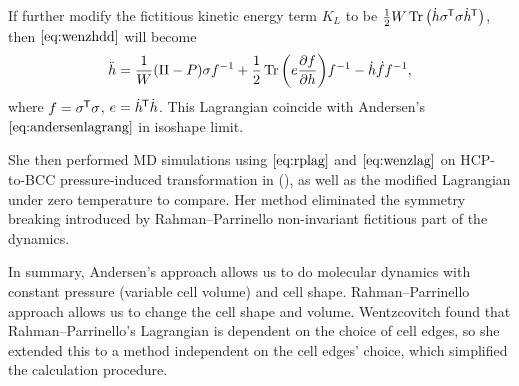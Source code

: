 If further modify the fictitious kinetic energy term $K_L$ to be
$ \frac{ 1 }{ 2 } W \Tr \big( \dot{ h } \sigma^{\mkern-1.5mu\mathsf{T}} \sigma \dot{ h }^{\mkern-1.5mu\mathsf{T}} \big)$,
then $\eqref{eq:wenzhdd}$ will become
\begin{equation}\label{eq:wenzhdd2}
	\ddot{h} = \frac{ 1 }{ W } (\Pi - P) \sigma f^{-1} + \frac{ 1 }{ 2 }
	\Tr \bigg( e \frac{ \partial f }{ \partial h } \bigg) f^{-1}
	- \dot{h} \dot{ f } f^{-1},
\end{equation}
where $f = \sigma ^{\mkern-1.5mu\mathsf{T}} \sigma$, $e = \dot{ h }^{\mkern-1.5mu\mathsf{T}} \dot{ h }$. This
Lagrangian coincide with Andersen's $\eqref{eq:andersenlagrang}$ in
isoshape limit.

She then performed MD simulations using $\eqref{eq:rplag}$ and
$\eqref{eq:wenzlag}$ on HCP-to-BCC
pressure-induced transformation in  (\cite{Wentzcovitch:1994kc}),
as well as the modified Lagrangian under zero
temperature to compare. Her method eliminated the symmetry breaking
introduced by Rahman--Parrinello non-invariant fictitious part of the dynamics.

In summary, Andersen's approach allows us to do molecular dynamics with constant
pressure (variable cell volume) and cell shape. Rahman--Parrinello approach allows us to change the cell shape
and volume. Wentzcovitch found that Rahman--Parrinello's Lagrangian is dependent
on the choice of cell edges, so she extended this to a method independent on
the cell edges' choice, which simplified the calculation procedure.
